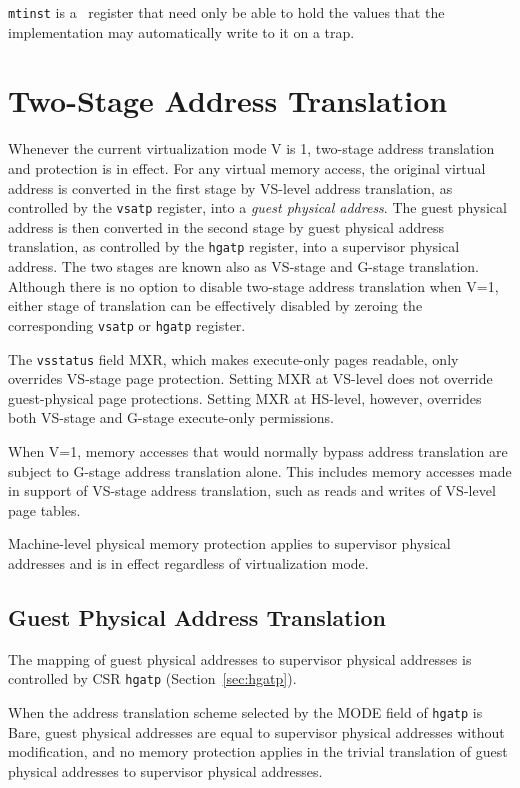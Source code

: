 {\tt mtinst} is a \warl\ register that need only be able to hold the
values that the implementation may automatically write to it on a trap.

\section{Two-Stage Address Translation}
\label{sec:two-stage-translation}

Whenever the current virtualization mode V is 1,
two-stage address translation and protection is in
effect.
For any virtual memory access, the original virtual address is
converted in the first stage
by VS-level address translation, as controlled by the {\tt vsatp}
register, into a {\em guest physical address}.
The guest physical address is then converted
in the second stage by guest physical address
translation, as controlled by the {\tt hgatp} register, into a supervisor
physical address.
The two stages are known also as VS-stage and G-stage translation.
Although there is no option to disable two-stage address translation when V=1,
either stage of translation can be effectively disabled by zeroing the
corresponding {\tt vsatp} or {\tt hgatp} register.

The {\tt vsstatus} field MXR, which makes execute-only pages readable, only
overrides VS-stage page protection.
Setting MXR at VS-level does not override guest-physical page protections.
Setting MXR at HS-level, however, overrides both VS-stage and G-stage
execute-only permissions.

When V=1, memory accesses that would normally bypass address translation are
subject to G-stage address translation alone.
This includes memory accesses made in support of VS-stage address translation,
such as reads and writes of VS-level page tables.

Machine-level physical memory protection applies to supervisor physical
addresses and is in effect regardless of virtualization mode.

\subsection{Guest Physical Address Translation}
\label{sec:guest-addr-translation}

The mapping of guest physical addresses to supervisor physical addresses is
controlled by CSR {\tt hgatp} (Section~\ref{sec:hgatp}).

When the address translation scheme selected by the MODE field of {\tt hgatp}
is Bare, guest physical addresses are equal to supervisor physical addresses
without modification, and no memory protection applies in the trivial
translation of guest physical addresses to supervisor physical addresses.

